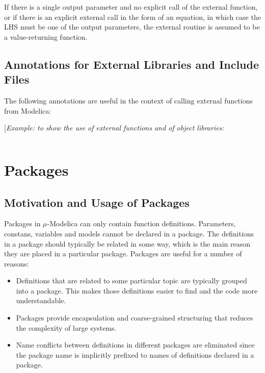 \documentclass[11pt,a4paper,notitlepage]{report}
\begin{document}
If there is a single output parameter and no explicit call of the external function, or if there is an explicit external call in the form of an equation, in which case the LHS must be one of the output parameters, the external routine is assumed to be a value-returning function. 

\section{Annotations for External Libraries and Include Files}

The following annotations are useful in the context of calling external functions from Modelica:
[\emph{Example: to show the use of external functions and of object libraries:}
\begin{verbatim}
\end{verbatim}


\chapter{Packages}

\section{Motivation and Usage of Packages}
Packages in $\mu$-Modelica can only contain function definitions. Parameters, constans, variables and models cannot be declared in a package. The definitions in a package should typically be related in some way, which is the main reason they are placed in a particular package.
Packages are useful for a number of reasons:
\begin{itemize}
\item Definitions that are related to some particular topic are typically grouped into a package. This makes those definitions easier to find and the code more understandable.
\item Packages provide encapsulation and coarse-grained structuring that reduces the complexity of large systems. 
\item Name conflicts between definitions in different packages are eliminated since the package name is implicitly prefixed to names of definitions declared in a package.
\end{itemize}
\end{document}
